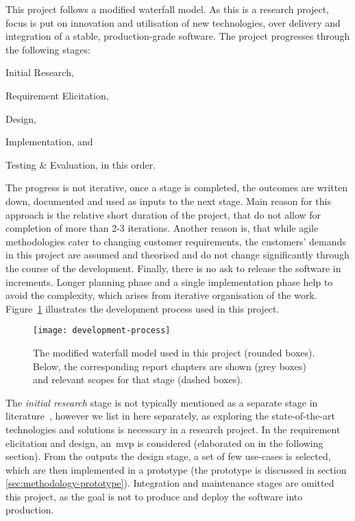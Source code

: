 This project follows a modified waterfall model. As this is a research project, focus is put on innovation and utilisation of new technologies, over delivery and integration of a stable, production-grade software. The project progresses through the following stages:
% 
\begin{enumerate*}[label=(\roman*)]
    \item Initial Research,
    \item Requirement Elicitation,
    \item Design,
    \item Implementation, and
    \item Testing \& Evaluation, in this order. 
\end{enumerate*}
% 
The progress is not iterative, once a stage is completed, the outcomes are written down, documented and used as inputs to the next stage. Main reason for this approach is the relative short duration of the project, that do not allow for completion of more than 2-3 iterations. Another reason is, that while agile methodologies cater to changing customer requirements, the customers' demands in this project are assumed and theorised and do not change significantly through the course of the development. Finally, there is no ask to release the software in increments. Longer planning phase and a single implementation phase help to avoid the complexity, which arises from iterative organisation of the work. Figure~\ref{fig:development-process} illustrates the development process used in this project.

\begin{figure}[htpb]
    \centering
    \texttt{[image: development-process]}
    \caption{The modified waterfall model used in this project (rounded boxes). Below, the corresponding report chapters are shown (grey boxes) and relevant scopes for that stage (dashed boxes).}
    \label{fig:development-process}
\end{figure}

The \textit{initial research} stage is not typically mentioned as a separate stage in literature~\cite{Sommerville2011SoftwareEngineering, CMS2005SelectingApproach}, however we list in here separately, as exploring the state-of-the-art technologies and solutions is necessary in a research project. In the requirement elicitation and design, an~\acrfull{mvp} is considered (elaborated on in the following section). From the outputs the design stage, a set of few use-cases is selected, which are then implemented in a prototype
 (the prototype is discussed in section \ref{sec:methodology-prototype}). Integration and maintenance stages are omitted this project, as the goal is not to produce and deploy the software into production.